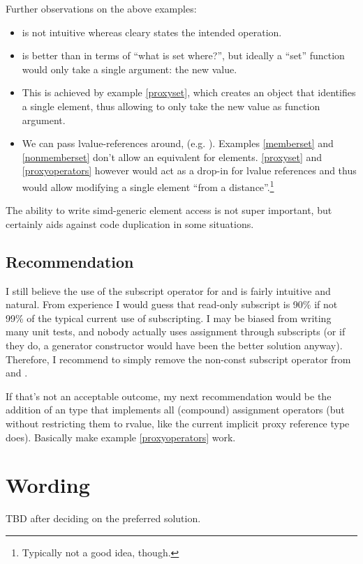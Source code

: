 Further observations on the above examples:
\begin{itemize}
  \item {} is not intuitive whereas  cleary
    states the intended operation.

  \item {} is better than  in terms of “what
    is set where?”, but ideally a “set” function would only take a single
    argument: the new value.

  \item This is achieved by example \ref{proxyset}, which creates an object
    that identifies a single element, thus allowing  to only take the
    new value as function argument.

  \item We can pass lvalue-references around, (e.g. ).
    Examples \ref{memberset} and \ref{nonmemberset} don't allow an equivalent
    for \simd elements.
    \ref{proxyset} and \ref{proxyoperators} however would act as a drop-in for
    lvalue references and thus would allow modifying a single \simd element
    “from a distance”.\footnote{Typically not a good idea, though.}
\end{itemize}

The ability to write simd-generic element access is not super important, but
certainly aids against code duplication in some situations.


\subsection{Recommendation}
I still believe the use of the subscript operator for \simd and \mask is fairly
intuitive and natural.
From experience I would guess that read-only subscript is 90\% if not 99\% of
the typical current use of subscripting.
I may be biased from writing many unit tests, and nobody actually uses
assignment through subscripts (or if they do, a generator constructor would
have been the better solution anyway).
Therefore, I recommend to simply remove the non-const subscript operator from
\simd and \mask.

If that's not an acceptable outcome, my next recommendation would be the
addition of an  type that implements all (compound)
assignment operators (but without restricting them to rvalue, like the current
implicit proxy reference type does).
Basically make example \ref{proxyoperators} work.

\section{Wording}\label{sec:wording}

TBD after deciding on the preferred solution.


